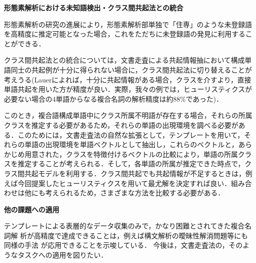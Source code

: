 \noindent
{\bf 形態素解析における未知語検出・クラス間共起法との統合}

形態素解析の研究の進展により，形態素解析部単独で「住専」のような未登録語を高精度に推定可能となった場合，これをただちに未登録語の発見に利用することができる．

クラス間共起法との統合については，文書走査による共起情報抽において構成単語同士の共起例が十分に得られない場合に，クラス間共起法に切り替えることが考えうる(Lauerによれば，十分に共起情報がある場合，クラスを介すより，直接単語共起を用いた方が精度が良い\cite{Lauer1995}．実際，我々の例では，ヒューリスティクスが必要ない場合の4単語からなる複合名詞の解析精度は約88\%であった)．

このとき，複合語構成単語中にクラス所属不明語が存在する場合，それらの所属クラスを推定する必要があるため，それらの単語の出現環境を調べる必要がある．このためには，文書走査法の自然な拡張として，テンプレートを用いて，それらの単語の出現環境を単語ベクトルとして抽出し，これらのベクトルと，あらかじめ用意された，クラスを特徴付けるベクトルの比較により，単語の所属クラスを推定することが考えられる．そして，各単語の所属が推定できた時点で，クラス間共起モデルを利用する．クラス間共起でも共起情報が不足するときは，例えば今回提案したヒューリスティクスを用いて最尤解を決定すれば良い．組み合わせは他にも考えられるため，さまざまな方法を比較する必要がある．

\noindent
{\bf 他の課題への適用}

テンプレートによる表層的なデータ収集のみで，かなり困難とされてきた複合名詞解
析が高精度で達成できることは，例えば構文解析の曖昧性解消問題等にも同様の手法
が応用できることを示唆している．
今後は，文書走査法の，そのようなタスクへの適用を図りたい．

\vspace{-0.5cm}






\begin{biography}


\end{biography}



